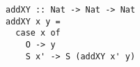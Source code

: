 \begin{figure}[!t]
  \centering
  \begin{minipage}{\columnwidth}
    \begin{lstlisting}[label={add_x_y}, caption={Function for \lstinline{addo in in out} direction}, captionpos=b, frame=tb]
addXY :: Nat -> Nat -> Nat
addXY x y =
  case x of
    O -> y
    S x' -> S (addXY x' y)
    \end{lstlisting}
  \end{minipage}
\end{figure}
